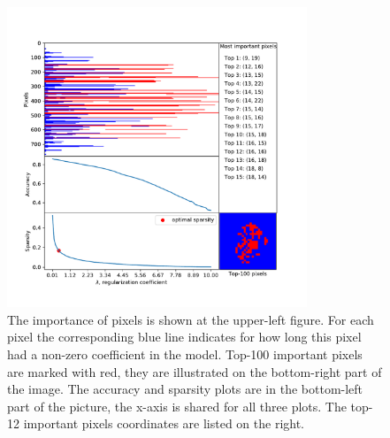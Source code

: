 \documentclass{article}
\begin{document}
\begin{figure}
    \label{fig:important_pixels}
    \centering
    \includegraphics[width=0.8\textwidth]{images/important_pixels}
    \caption{The importance of pixels is shown at the upper-left figure. For each pixel the corresponding blue line indicates for how long this pixel had a non-zero coefficient in the model. Top-100 important pixels are marked with red, they are illustrated on the bottom-right part of the image. The accuracy and sparsity plots are in the bottom-left part of the picture, the x-axis is shared for all three plots. The top-12 important pixels coordinates are listed on the right.}
\end{figure}
\end{document}
